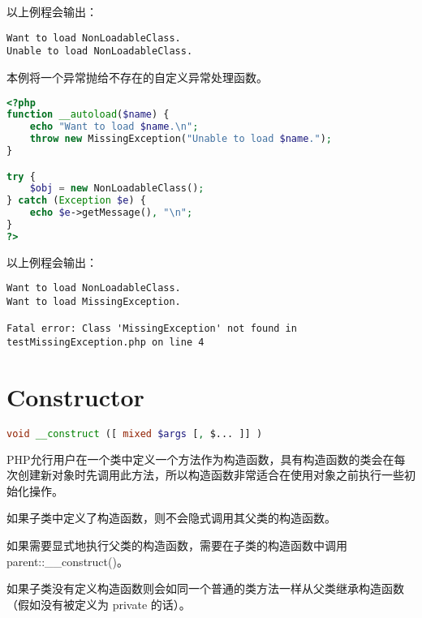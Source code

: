 以上例程会输出：

\begin{verbatim}
Want to load NonLoadableClass.
Unable to load NonLoadableClass.
\end{verbatim}

本例将一个异常抛给不存在的自定义异常处理函数。

\begin{lstlisting}[language=PHP]
<?php
function __autoload($name) {
    echo "Want to load $name.\n";
    throw new MissingException("Unable to load $name.");
}

try {
    $obj = new NonLoadableClass();
} catch (Exception $e) {
    echo $e->getMessage(), "\n";
}
?>
\end{lstlisting}

以上例程会输出：

\begin{verbatim}
Want to load NonLoadableClass.
Want to load MissingException.

Fatal error: Class 'MissingException' not found in testMissingException.php on line 4
\end{verbatim}

\chapter{Constructor}

\begin{lstlisting}[language=PHP]
void __construct ([ mixed $args [, $... ]] )
\end{lstlisting}

PHP允行用户在一个类中定义一个方法作为构造函数，具有构造函数的类会在每次创建新对象时先调用此方法，所以构造函数非常适合在使用对象之前执行一些初始化操作。

\begin{compactitem}
\item 如果子类中定义了构造函数，则不会隐式调用其父类的构造函数。

\item 如果需要显式地执行父类的构造函数，需要在子类的构造函数中调用 parent::\_\_construct()。

\item 如果子类没有定义构造函数则会如同一个普通的类方法一样从父类继承构造函数（假如没有被定义为 private 的话）。
\end{compactitem}




